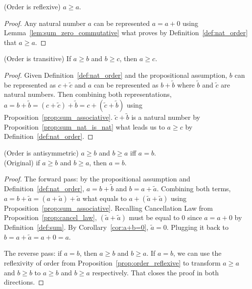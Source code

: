 \begin{subsequence}
    \begin{proposition}
        \textup{(Order is reflexive)} $a \geq a$.\label{prop:order_reflexive}
    \end{proposition}
    \begin{proof}
        Any natural number $a$ can be represented $a=a + 0$ using Lemma~\ref{lem:sum_zero_commutative} what proves by Definition~\ref{def:nat_order} that $a\geq a$. 
    \end{proof}
    \begin{proposition}
        \textup{(Order is transitive)}  If $a \geq b$ and $b \geq c$, then $a \geq c$.\label{prop:order_transitive}
    \end{proposition}
    \begin{proof}
        Given Definition~\ref{def:nat_order} and the propositional assumption, $b$ can be represented as $c+\tilde{c}$ and $a$ can be represented as $b+\tilde{b}$ where $\tilde{b}$ and $\tilde{c}$ are natural numbers. Then combining both representations, $a=b+\tilde{b}=(c+\tilde{c}) + \tilde{b}=c+(\tilde{c}+\tilde{b})$ using Proposition~\ref{prop:sum_associative}. $\tilde{c} + \tilde{b}$ is a natural number by Proposition~\ref{prop:sum_nat_is_nat} what leads us to $a\geq c$ by Definition~\ref{def:nat_order}.
    \end{proof}
    \begin{proposition}
        \textup{(Order is antisymmetric)} $a \geq b$ and $b \geq a$ iff $a = b$.\label{prop:order_antisymmetric}\\
        (Original) if $a \geq b$ and $b \geq a$, then $a = b$.
    \end{proposition}
    \begin{proof}
        The forward pass: by the propositional assumption and Definition~\ref{def:nat_order}, $a=b+\tilde{b}$ and $b=a+\tilde{a}$. Combining both terms, $a=b+\tilde{a}=(a+\tilde{a})+\tilde{a}$ what equals to $a+(\tilde{a}+\tilde{a})$ using Proposition~\ref{prop:sum_associative}. Recalling Cancellation Law from Proposition~\ref{prop:cancel_law}, $(\tilde{a} + \tilde{a})$ must be equal to $0$ since $a=a+0$ by Definition~\ref{def:sum}. By Corollary~\ref{cor:a+b=0}, $\tilde{a}=0$. Plugging it back to $b=a+\tilde{a}=a+0=a$. 
        
        The reverse pass: if $a=b$, then $a\geq b$ and $b \geq a$. If $a=b$, we can use the reflexivity of order from Proposition~\ref{prop:order_reflexive} to transform $a\geq a$ and $b \geq b$ to $a \geq b$ and $b \geq a$ respectively. That closes the proof in both directions.
    \end{proof}


\end{subsequence}
